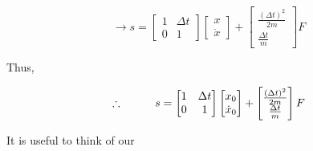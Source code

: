 \documentclass[11pt]{article}
\begin{document}
\[
\rightarrow
s =
\begin{bmatrix}
  1 & \Delta{t}\\
  0 & 1
\end{bmatrix}
\begin{bmatrix}
  x\\
  \dot{x}
\end{bmatrix}
+
\begin{bmatrix}
  \frac{(\Delta t)^2}{2m}\\
   \frac{\Delta t}{m}
\end{bmatrix}
F
\]


Thus,

\[
\therefore
\hspace{10mm}
s
=
\begin{bmatrix}
  1 & \Delta t\\
  0 & 1
\end{bmatrix}
\begin{bmatrix}
  x_0\\
  \dot{x}_0
\end{bmatrix}
+
\begin{bmatrix}
  \frac{(\Delta t)^2}{2m}\\
  \frac{\Delta t}{m}
\end{bmatrix}
F
\]

It is useful to think of our



\end{document}
